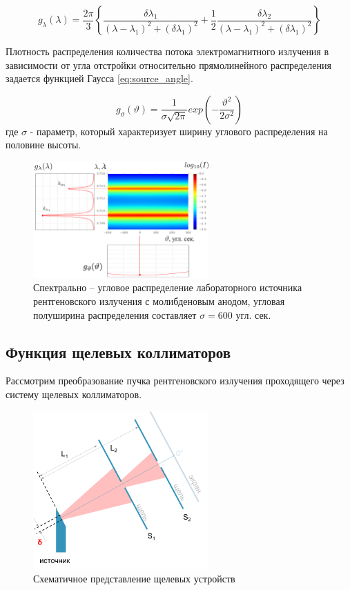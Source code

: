  \begin{equation} \label{eq:source_spectral}
   g_{\lambda} (\lambda) = \frac{2\pi}{3}  \left \{ \frac{\delta\lambda_1}{(\lambda - \lambda_1)^2+
   (\delta \lambda_1)^2} + \frac{1}{2} \frac{\delta\lambda_2}{(\lambda-\lambda_1)^2+(\delta\lambda_1)^2} \right \}
  \end{equation}

  Плотность распределения количества потока электромагнитного излучения в зависимости от угла
  отстройки относительно прямолинейного распределения задается функцией Гаусса \ref{eq:source_angle}.

  \begin{equation} \label{eq:source_angle}
    g_{\vartheta} (\vartheta) = \frac{1}{\sigma \sqrt{ 2\pi}} exp  ( -\frac{\vartheta^2}{2\sigma^2} )
   \end{equation}
где $\sigma$ - параметр, который характеризует ширину углового распределения на половине высоты.

\begin{figure}[H]
  \centering
  \includegraphics[width=0.6\textwidth]{images/source_distrubition.png}
  \caption{Спектрально – угловое распределение лабораторного источника рентгеновского
   излучения с молибденовым анодом, угловая полуширина распределения составляет $\sigma = 600$ угл. сек. }
  \label{ris:source_distrubition}
\end{figure}


 \subsection{Функция щелевых коллиматоров}
 \label{sec:slits_section}
 Рассмотрим преобразование пучка рентгеновского излучения проходящего через систему щелевых коллиматоров.
 \begin{figure}[H]
   \centering
   \includegraphics[width=0.6\textwidth]{images/for_slits.png}
   \caption{Схематичное представление щелевых устройств}
   \label{ris:for_slits}
 \end{figure}

